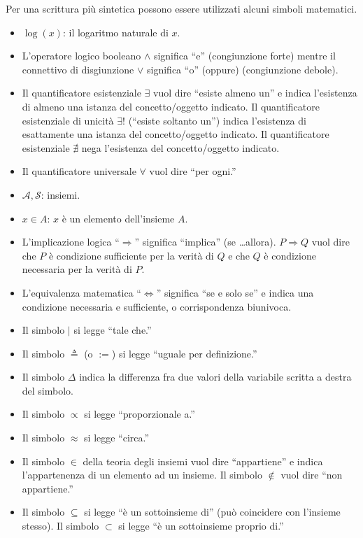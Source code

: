 \documentclass[
  11pt,
]{krantz}
\providecommand{\tightlist}{%
  \setlength{\itemsep}{0pt}\setlength{\parskip}{0pt}}
\theoremstyle{definition}
\theoremstyle{definition}
\theoremstyle{definition}
\theoremstyle{definition}
\theoremstyle{remark}
\begin{document}
Per una scrittura più sintetica possono essere utilizzati alcuni simboli matematici.

\begin{itemize}
\tightlist
\item
  \(\log(x)\): il logaritmo naturale di \(x\).
\item
  L'operatore logico booleano \(\land\) significa ``e'' (congiunzione forte) mentre il connettivo di disgiunzione \(\lor\) significa ``o'' (oppure) (congiunzione debole).
\item
  Il quantificatore esistenziale \(\exists\) vuol dire ``esiste almeno un'' e indica l'esistenza di almeno una istanza del concetto/oggetto indicato. Il quantificatore esistenziale di unicità \(\exists!\) (``esiste soltanto un'') indica l'esistenza di esattamente una istanza del concetto/oggetto indicato. Il quantificatore esistenziale \(\nexists\) nega l'esistenza del concetto/oggetto indicato.
\item
  Il quantificatore universale \(\forall\) vuol dire ``per ogni.''
\item
  \(\mathcal{A, S}\): insiemi.
\item
  \(x \in A\): \(x\) è un elemento dell'insieme \(A\).
\item
  L'implicazione logica ``\(\Rightarrow\)'' significa ``implica'' (se \ldots allora). \(P \Rightarrow Q\) vuol dire che \(P\) è condizione sufficiente per la verità di \(Q\) e che \(Q\) è condizione necessaria per la verità di \(P\).
\item
  L'equivalenza matematica ``\(\iff\)'' significa ``se e solo se'' e indica una condizione necessaria e sufficiente, o corrispondenza biunivoca.
\item
  Il simbolo \(\vert\) si legge ``tale che.''
\item
  Il simbolo \(\triangleq\) (o \(:=\)) si legge ``uguale per definizione.''
\item
  Il simbolo \(\Delta\) indica la differenza fra due valori della variabile scritta a destra del simbolo.
\item
  Il simbolo \(\propto\) si legge ``proporzionale a.''
\item
  Il simbolo \(\approx\) si legge ``circa.''
\item
  Il simbolo \(\in\) della teoria degli insiemi vuol dire ``appartiene'' e indica l'appartenenza di un elemento ad un insieme. Il simbolo \(\notin\) vuol dire ``non appartiene.''
\item
  Il simbolo \(\subseteq\) si legge ``è un sottoinsieme di'' (può coincidere con l'insieme stesso). Il simbolo \(\subset\) si legge ``è un sottoinsieme proprio di.''

\end{itemize}
\end{document}

